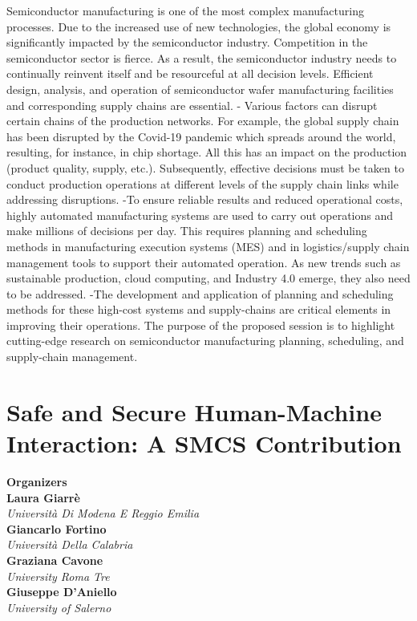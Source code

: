 Semiconductor manufacturing is one of the most complex manufacturing processes. Due to the increased use of new technologies, the global economy is significantly impacted by the semiconductor industry. Competition in the semiconductor sector is fierce. As a result, the semiconductor industry needs to continually reinvent itself and be resourceful at all decision levels. Efficient design, analysis, and operation of semiconductor wafer manufacturing facilities and corresponding supply chains are essential.  - Various factors can disrupt certain chains of the production networks. For example, the global supply chain has been disrupted by the Covid-19 pandemic which spreads around the world, resulting, for instance, in chip shortage. All this has an impact on the production (product quality, supply, etc.). Subsequently, effective decisions must be taken to conduct production operations at different levels of the supply chain links while addressing disruptions. -To ensure reliable results and reduced operational costs, highly automated manufacturing systems are used to carry out operations and make millions of decisions per day. This requires planning and scheduling methods in manufacturing execution systems (MES) and in logistics/supply chain management tools to support their automated operation. As new trends such as sustainable production, cloud computing, and Industry 4.0 emerge, they also need to be addressed. -The development and application of planning and scheduling methods for these high-cost systems and supply-chains are critical elements in improving their operations. The purpose of the proposed session is to highlight cutting-edge research on semiconductor manufacturing planning, scheduling, and supply-chain management. 

\section{Safe and Secure Human-Machine Interaction: A SMCS Contribution}


\large \textbf{Organizers} \normalsize \vspace{2mm} \\
\textbf{Laura  Giarrè} \\ 
\textit{Università Di Modena E Reggio Emilia} \vspace{{2mm}} \\
\textbf{Giancarlo  Fortino} \\ 
\textit{Università Della Calabria} \vspace{{2mm}} \\
\textbf{Graziana  Cavone} \\ 
\textit{University Roma Tre} \vspace{{2mm}} \\
\textbf{Giuseppe  D'Aniello} \\ 
\textit{University of Salerno}

